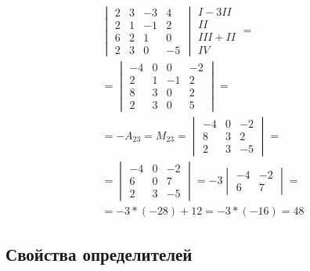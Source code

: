\documentclass{article}
\begin{document}
\begin{gather*}
	\begin{vmatrix}
		2 & 3 & -3 & 4 \\
		2 & 1 & -1 & 2 \\
		6 & 2 & 1 & 0 \\
		2 & 3 & 0 & -5
	\end{vmatrix}
	\begin{matrix}
		I - 3II \\
		II \\
		III + II \\
		IV
	\end{matrix} = \\
	= \begin{vmatrix}
		-4 & 0 & 0 & -2 \\
		2 & 1 & -1 & 2 \\
		8 & 3 & 0 & 2 \\
		2 & 3 & 0 & 5
	\end{vmatrix} = \\
	= -A_{23} = M_{23} = \begin{vmatrix}
		-4 & 0 & -2 \\
		8 & 3 & 2 \\
		2 & 3 & -5
	\end{vmatrix} = \\
	= \begin{vmatrix}
		-4 & 0 & -2 \\
		6 & 0 & 7 \\
		2 & 3 & -5
	\end{vmatrix}
	= -3
	\begin{vmatrix}
		-4 & -2 \\
		6 & 7
	\end{vmatrix} = \\
	= -3 * (-28) + 12 = -3 * (-16) = 48
\end{gather*}

\subsection{Свойства определителей}
\end{document}
